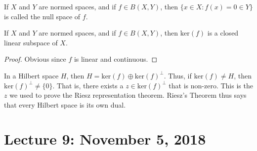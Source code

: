             If $X$ and $Y$ are normed spaces, and if
            $f\in{B(X,Y)}$, then
            $\{x\in{X}:f(x)=0\in{Y}\}$ is called the null
            space of $f$.
            \begin{theorem}
                If $X$ and $Y$ are normed spaces, and if
                $f\in{B(X,Y)}$, then $\mathrm{ker}(f)$ is a closed
                linear subspace of $X$.
            \end{theorem}
            \begin{proof}
                Obvious since $f$ is linear and continuous.
            \end{proof}
            In a Hilbert space $H$, then
            $H=\mathrm{ker}(f)\oplus\mathrm{ker}(f)^{\perp}$. Thus, if
            $\mathrm{ker}(f)\ne{H}$, then $\mathrm{ker}(f)^{\perp}\ne\{0\}$.
            That is, there exists a $z\in\mathrm{ker}(f)^{\perp}$ that
            is non-zero. This is the $z$ we used to prove the
            Riesz representation theorem. Riesz's
            Theorem thus says that every Hilbert space is its own dual.
    \section{Lecture 9: November 5, 2018}
